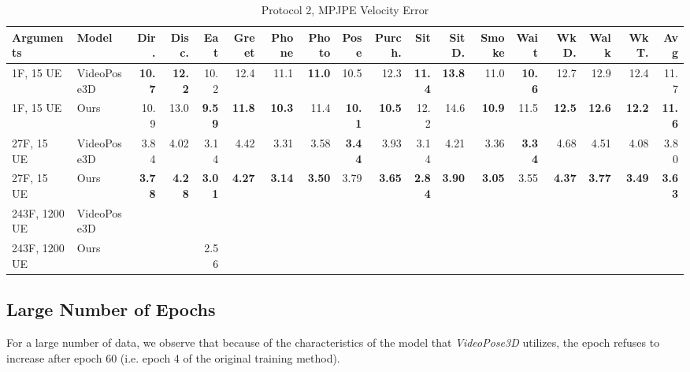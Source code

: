 \documentclass[10pt,twocolumn,letterpaper]{article}
\begin{document}
\begin{center}
\begin{table}
\small
\setlength\tabcolsep{2.3pt}
\begin{tabular}{l|l|rrrrrrrrrrrrrrrr} 
Arguments & Model & Dir. & Disc. & Eat & Greet & Phone & Photo & Pose & Purch. & Sit & SitD. & Smoke & Wait & WkD. & Walk & WkT. & \textbf{Avg} \\
\hline
1F, 15 UE & VideoPose3D & \textbf{10.7} & \textbf{12.2} & 10.2 & 12.4 & 11.1 & \textbf{11.0} & 10.5 & 12.3 & \textbf{11.4} & \textbf{13.8} & 11.0 & \textbf{10.6} & 12.7 & 12.9 & 12.4 & 11.7  \\
1F, 15 UE & Ours & 10.9 & 13.0 & \textbf{9.59} & \textbf{11.8} & \textbf{10.3} & 11.4 & \textbf{10.1} & \textbf{10.5} & 12.2 & 14.6 & \textbf{10.9} & 11.5 & \textbf{12.5} & \textbf{12.6} & \textbf{12.2} & \textbf{11.6} \\
\hline
27F, 15 UE & VideoPose3D & 3.84 & 4.02 & 3.14 & 4.42 & 3.31 & 3.58 & \textbf{3.44} & 3.93 & 3.14 & 4.21 & 3.36 & \textbf{3.34} & 4.68 & 4.51 & 4.08 & 3.80 \\
27F, 15 UE & Ours & \textbf{3.78} & \textbf{4.28} & \textbf{3.01} & \textbf{4.27} & \textbf{3.14} & \textbf{3.50} & 3.79 & \textbf{3.65} & \textbf{2.84} & \textbf{3.90} & \textbf{3.05} & 3.55 & \textbf{4.37} & \textbf{3.77} & \textbf{3.49} & \textbf{3.63}\\
\hline

243F, 1200 UE & VideoPose3D & & &  \\
243F, 1200 UE & Ours & & & 2.56\\

 
\hline

\hline
\end{tabular}

\caption{Protocol 2, MPJPE Velocity Error}
\end{table}
\end{center}


\subsection{Large Number of Epochs}

For a large number of data, we observe that because of the characteristics of the model that \textit{VideoPose3D}
utilizes, the epoch refuses to increase after epoch 60 (i.e. epoch 4 of the original training method).
\end{document}

